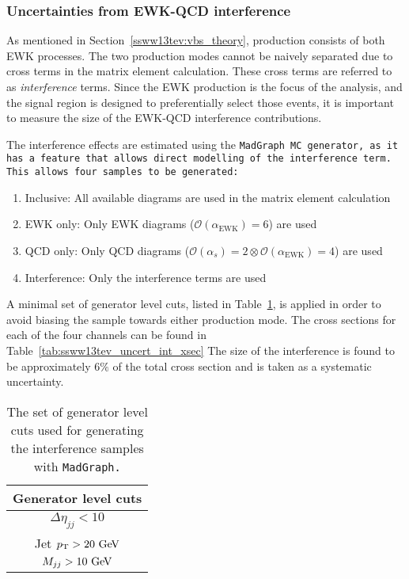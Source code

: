 \subsubsection{Uncertainties from EWK-QCD interference}\label{ssww13tev:interference}
As mentioned in Section~\ref{ssww13tev:vbs_theory}, \ssww production consists of both EWK processes.
The two production modes cannot be naively separated due to cross terms in the matrix element calculation.
These cross terms are referred to as \emph{interference} terms.
Since the \ssww EWK production is the focus of the analysis, and the signal region is designed to preferentially select those events, it is important to measure the size of the EWK-QCD interference contributions.

The interference effects are estimated using the \tt{MadGraph} MC generator, as it has a feature that allows direct modelling of the interference term.
This allows four samples to be generated:
\begin{enumerate}
\item Inclusive: All available diagrams are used in the matrix element calculation
\item EWK only: Only EWK diagrams ($\mathcal{O}(\alpha_{\textrm{EWK}}) = 6$) are used
\item QCD only: Only QCD diagrams ($\mathcal{O}(\alpha_s) = 2 \otimes \mathcal{O}(\alpha_{\textrm{EWK}}) = 4$) are used
\item Interference: Only the interference terms are used
\end{enumerate}
A minimal set of generator level cuts, listed in Table~\ref{tab:ssww13tev_uncert_int_cuts}, is applied in order to avoid biasing the sample towards either production mode.
The cross sections for each of the four channels can be found in Table~\ref{tab:ssww13tev_uncert_int_xsec}
The size of the interference is found to be approximately $6\%$ of the total cross section and is taken as a systematic uncertainty.

\begin{table}[htbp]
  \centering
  \begin{tabular}{c}
    Generator level cuts\\
    \hline\hline
    $\Delta\eta_{jj} < 10$ \\
    Jet $\pt > 20\gev$ \\
    $M_{jj} > 10\gev$ \\
    \hline
  \end{tabular}
  \caption{The set of generator level cuts used for generating the interference samples with \tt{MadGraph}.}
  \label{tab:ssww13tev_uncert_int_cuts}
\end{table}

